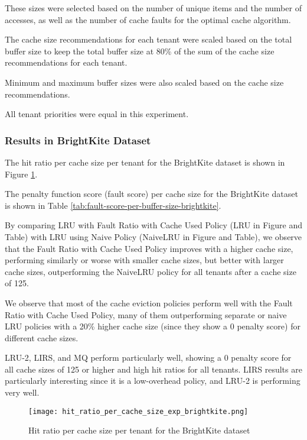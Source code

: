 These sizes were selected based on the number of unique items and the number of accesses, as 
well as the number of cache faults for the optimal cache algorithm.

The cache size recommendations for each tenant were scaled based on the total buffer size to 
keep the total buffer size at 80\% of the sum of the cache size recommendations for each tenant.

Minimum and maximum buffer sizes were also scaled based on the cache size recommendations.

All tenant priorities were equal in this experiment.

\subsubsection*{Results in BrightKite Dataset}

The hit ratio per cache size per tenant for the BrightKite dataset is shown in Figure 
\ref{fig:hit_ratio_per_cache_size_exp_brightkite}.

The penalty function score (fault score) per cache size for the BrightKite dataset 
is shown in Table \ref{tab:fault-score-per-buffer-size-brightkite}.

By comparing LRU with Fault Ratio with Cache Used Policy (LRU in Figure and Table) with LRU 
using Naive Policy (NaiveLRU in Figure and Table), we observe that the Fault Ratio with Cache 
Used Policy improves with a higher cache size, performing similarly or worse with smaller cache 
sizes, but better with larger cache sizes, outperforming the NaiveLRU policy for all tenants 
after a cache size of 125.

We observe that most of the cache eviction policies perform well with the Fault Ratio with 
Cache Used Policy, many of them outperforming separate or naive LRU policies with a 20\% 
higher cache size (since they show a 0 penalty score) for different cache sizes.

LRU-2, LIRS, and MQ perform particularly well, showing a 0 penalty score for all cache sizes of 
125 or higher and high hit ratios for all tenants. LIRS results are particularly interesting 
since it is a low-overhead policy, and LRU-2 is performing very well.

\begin{figure}[H]
    \centering
    \texttt{[image: hit\_ratio\_per\_cache\_size\_exp\_brightkite.png]}
    \caption{Hit ratio per cache size per tenant for the BrightKite dataset}
    \label{fig:hit_ratio_per_cache_size_exp_brightkite}
\end{figure}

